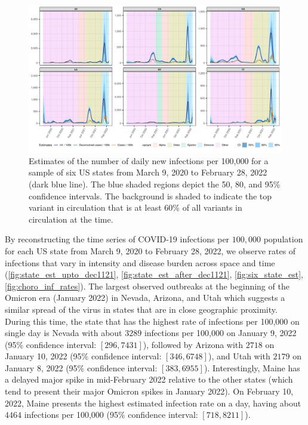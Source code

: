 \documentclass{article}
\begin{document}
\begin{figure}[!tb]
\centering
    \includegraphics[width=.9\linewidth]{state_niauc_est_6states.pdf}
    \caption{Estimates of the number of daily new infections per 100,000 for a
    sample of six US states from March 9, 2020 to February 28, 2022 (dark blue
    line). The blue shaded regions depict the 50, 80, and 95\% confidence
    intervals. The background is shaded to indicate the top variant in
    circulation that is at least 60\% of all variants in circulation at the
    time.}
    \label{fig:six_state_est}
\end{figure}

By reconstructing the time series of COVID-19 infections per $100,000$
population for each US state from March 9, 2020 to February 28, 2022, we observe
rates of infections that vary in intensity and disease burden across space and
time (\autoref{fig:state_est_upto_dec1121}, \autoref{fig:state_est_after_dec1121},
 \autoref{fig:six_state_est}, \autoref{fig:choro_inf_rates}). The
largest observed outbreaks at the beginning of the Omicron era (January
2022) in Nevada, Arizona, and Utah which suggests a similar spread of the virus in
states that are in close geographic proximity. During this time, the state that
has the highest rate of infections per 100,000 on single day is Nevada with
about $3289$ infections per 100,000 on January 9, 2022 (95\% confidence interval:
$[296, 7431]$), followed by Arizona with $2718$ on January 10, 2022 (95\%
confidence interval: $[346, 6748]$), and Utah with $2179$ on January 8, 2022
(95\% confidence interval: $[383, 6955]$).
Interestingly, Maine has a delayed major spike in mid-February 2022 relative to 
the other states (which tend to present their major Omicron spikes in January 2022).
On February 10, 2022, Maine presents the highest estimated infection rate on a day, 
having about $4464$ infections per 100,000 (95\% confidence interval: $[718, 8211]$).
\end{document}
